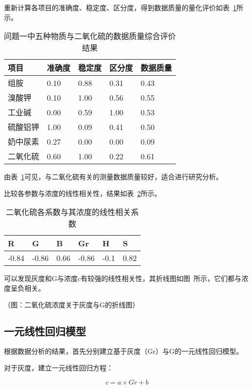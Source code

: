 重新计算各项目的准确度、稳定度、区分度，得到数据质量的量化评价如表~\ref{SO2_Judge}所示。

\begin{table}[]
    \centering
    \caption{问题一中五种物质与二氧化硫的数据质量综合评价结果}
    \label{SO2_Judge}
    \begin{tabular}{@{}lllll@{}}
    \toprule
    项目   & 准确度  & 稳定度  & 区分度  & 数据质量 \\ \midrule
    组胺   & 0.10 & 0.88 & 0.31 & 0.43 \\
    溴酸钾  & 0.10 & 1.00 & 0.56 & 0.55 \\
    工业碱  & 0.00 & 0.59 & 1.00 & 0.53 \\
    硫酸铝钾 & 1.00 & 0.09 & 0.41 & 0.50 \\
    奶中尿素 & 0.27 & 0.00 & 0.00 & 0.09 \\
    二氧化硫 & 0.60 & 1.00 & 0.22 & 0.61 \\ \bottomrule
    \end{tabular}
    \end{table}

由表~\ref{SO2_Judge}可见，与二氧化硫有关的测量数据质量较好，适合进行研究分析。

比较各参数与浓度的线性相关性，结果如表~\ref{SO2_corr}所示。

\begin{table}[]
    \centering
    \caption{二氧化硫各系数与其浓度的线性相关系数}
    \label{SO2_corr}
    \begin{tabular}{@{}llllll@{}}
    \toprule
    R     & G     & B    & Gr    & H    & S    \\ \midrule
    -0.84 & -0.86 & 0.66 & -0.86 & -0.1 & 0.82 \\ \bottomrule
    \end{tabular}
    \end{table}


可以发现灰度和G与浓度c有较强的线性相关性，其折线图如图~所示，它们都与浓度呈负相关。

（图：二氧化硫浓度关于灰度与G的折线图）

\subsection{一元线性回归模型}

根据数据分析的结果，首先分别建立基于灰度（Gr）与G的一元线性回归模型。

对于灰度，建立一元线性回归方程：

$$c=a \times Gr+b$$

